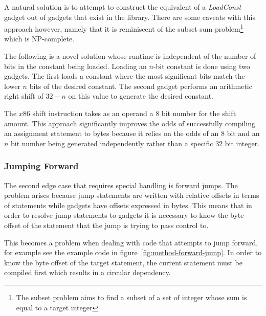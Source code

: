     A natural solution is to attempt to construct the equivalent of a
    \emph{LoadConst} gadget out of gadgets that exist in the library. There are
    some caveats with this approach however, namely that it is reminiscent of
    the subset sum problem\footnote{The subset problem aims to find a subset of
    a set of integer whose sum is equal to a target integer} which is
    NP-complete.

    The following is a novel solution whose runtime is independent of the number
    of bits in the constant being loaded. Loading an $n$-bit constant is done
    using two gadgets. The first loads a constant where the most significant
    bits match the lower $n$ bits of the desired constant. The second gadget
    performs an arithmetic right shift of $32-n$ on this value to generate the
    desired constant.

    The $x86$ shift instruction takes as an operand a $8$ bit number for the
    shift amount. This approach significantly improves the odds of successfully
    compiling an assignment statement to bytes because it relies on the odds of
    an $8$ bit and an $n$ bit number being generated independently rather than a
    specific $32$ bit integer.

    \subsubsection{Jumping Forward}

    The second edge case that requires special handling is forward jumps. The
    problem arises because jump statements are written with relative offsets in
    terms of statements while gadgets have offsets expressed in bytes. This
    means that in order to resolve jump statements to gadgets it is necessary to
    know the byte offset of the statement that the jump is trying to pass
    control to.

    This becomes a problem when dealing with code that attempts to jump forward,
    for example see the example code in figure~\ref{fig:method-forward-jump}.
    In order to know the byte offset of the target statement, the current
    statement must be compiled first which results in a circular dependency.

